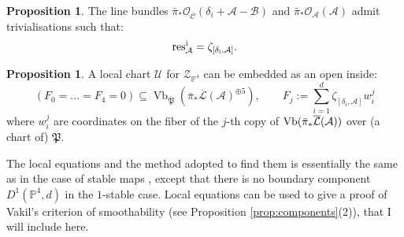 \documentclass[11pt]{amsart}
\newcommand{\pazocal}{\mathcal}
\newcommand{\PP}{\mathbb P}
\newcommand{\OO}{\mathcal{O}}
\newcommand{\A}{\mathcal A}
\newcommand{\B}{\mathcal B}
\newcommand{\hP}{\overline{\mathfrak{P}}}
\newcommand{\hL}{\overline{\mathcal{L}}}
\theoremstyle{definition}
\newtheorem{prop}[thm]{Proposition}
\theoremstyle{definition}
\begin{document}
\begin{prop}\cite[Proposition 4.13]{HL}\label{prop:res}
The line bundles $\bar\pi_*\OO_{\overline{\mathcal C}}(\pazocal \delta_i+\A-\B)$ and $\bar\pi_*\OO_{\A}(\A) $ admit trivialisations such that:
\[\rm{res}^i_{\mathcal A}=\zeta_{[\delta_i,\A]}.\]
\end{prop}
\begin{prop}\label{prop:equations} \cite[Theorems 2.17-19]{HL}
A local chart $\pazocal U$ for $\mathcal Z_{\PP^4}$ can be embedded as an open inside:
\[ (F_0=\ldots=F_4=0)\subseteq \operatorname{Vb}_{\hP}(\bar{\pi}_*\hL(\A)^{\oplus 5}),\qquad F_j:=\sum_{i=1}^d \zeta_{[\delta_i,\pazocal A]}w_i^j \]
where $w_i^j$ are coordinates on the fiber of the $j$-th copy of $\rm{Vb}(\bar{\pi}_*\hL(\A))$ over (a chart of) $\hP$.
\end{prop}
The local equations and the method adopted to find them is essentially the same as in the case of stable maps \cite{HL}, except that there is no boundary component $D^1(\PP^4,d)$ in the $1$-stable case. Local equations can be used to give a proof of Vakil's criterion of smoothability (see Proposition \ref{prop:components}(2)), that I will include here.
\end{document}
